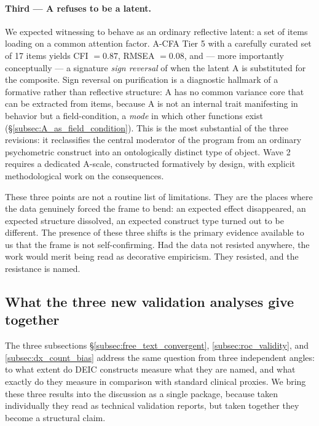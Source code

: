\paragraph{Third --- A refuses to be a latent.} We expected witnessing to behave as an ordinary reflective latent: a set of items loading on a common attention factor. A-CFA Tier 5 with a carefully curated set of 17 items yields CFI $= 0.87$, RMSEA $= 0.08$, and --- more importantly conceptually --- a signature \emph{sign reversal} of \IMM{} when the latent A is substituted for the composite. Sign reversal on purification is a diagnostic hallmark of a formative rather than reflective structure: A has no common variance core that can be extracted from items, because A is not an internal trait manifesting in behavior but a field-condition, a \emph{mode} in which other functions exist (§\ref{subsec:A_as_field_condition}). This is the most substantial of the three revisions: it reclassifies the central moderator of the program from an ordinary psychometric construct into an ontologically distinct type of object. Wave 2 requires a dedicated A-scale, constructed formatively by design, with explicit methodological work on the consequences.

These three points are not a routine list of limitations. They are the places where the data genuinely forced the frame to bend: an expected effect disappeared, an expected structure dissolved, an expected construct type turned out to be different. The presence of these three shifts is the primary evidence available to us that the frame is not self-confirming. Had the data not resisted anywhere, the work would merit being read as decorative empiricism. They resisted, and the resistance is named.

\subsection{What the three new validation analyses give together}
\label{subsec:validity_package}

The three subsections §\ref{subsec:free_text_convergent}, \ref{subsec:roc_validity}, and \ref{subsec:dx_count_bias} address the same question from three independent angles: to what extent do DEIC constructs measure what they are named, and what exactly do they measure in comparison with standard clinical proxies. We bring these three results into the discussion as a single package, because taken individually they read as technical validation reports, but taken together they become a structural claim.

